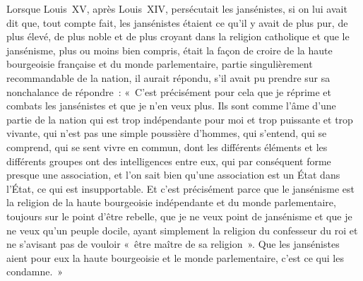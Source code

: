 \documentclass[french,twoside]{book} %
\begin{document}
Lorsque Louis XV, après Louis XIV, persécutait les jansénistes, si on lui avait dit que, tout compte fait, les jansénistes étaient ce qu’il y avait de plus pur, de plus élevé, de plus noble et de plus croyant dans la religion catholique et que le jansénisme, plus ou moins bien compris, était la façon de croire de la haute bourgeoisie française et du monde parlementaire, partie singulièrement recommandable de la nation, il aurait répondu, s’il avait pu prendre sur sa nonchalance de répondre : « C’est précisément pour cela que je réprime et combats les jansénistes et que je n’en  veux plus. Ils sont comme l’âme d’une partie de la nation qui est trop indépendante pour moi et trop puissante et trop vivante, qui n’est pas une simple poussière d’hommes, qui s’entend, qui se comprend, qui se sent vivre en commun, dont les différents éléments et les différents groupes ont des intelligences entre eux, qui par conséquent forme presque une association, et l’on sait bien qu’une association est un État dans l’État, ce qui est insupportable. Et c’est précisément parce que le jansénisme est la religion de la haute bourgeoisie indépendante et du monde parlementaire, toujours sur le point d’être rebelle, que je ne veux point de jansénisme et que je ne veux qu’un peuple docile, ayant simplement la religion du confesseur du roi et ne s’avisant pas de vouloir « être maître de sa religion ». Que les jansénistes aient pour eux la haute bourgeoisie et le monde parlementaire, c’est ce qui les condamne. »\par
\end{document}
